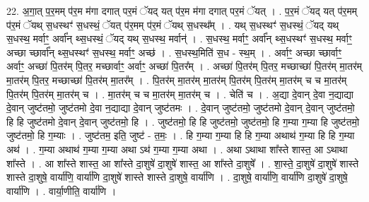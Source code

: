 \documentclass[17pt]{extarticle}
\begin{document}
22. अ॒गा॒त् प॒र॒मम् प॑र॒म म॑गा दगात् पर॒मं ॅयद् यत् प॑र॒म म॑गा दगात् पर॒मं ॅयत् । . प॒र॒मं ॅयद् यत् प॑र॒मम् प॑र॒मं ॅयथ् स॒धस्थꣳ॑ स॒धस्थं॒ ॅयत् प॑र॒मम् प॑र॒मं ॅयथ् स॒धस्थ᳚म् । . यथ् स॒धस्थꣳ॑ स॒धस्थं॒ ॅयद् यथ् स॒धस्थ॒ मर्वाꣳ॒॒ अर्वा᳚न् थ्स॒धस्थं॒ ॅयद् यथ् स॒धस्थ॒ मर्वान्॑ । . स॒धस्थ॒ मर्वाꣳ॒॒ अर्वा᳚न् थ्स॒धस्थꣳ॑ स॒धस्थ॒ मर्वाꣳ॒॒ अच्छा च्छार्वा᳚न् थ्स॒धस्थꣳ॑ स॒धस्थ॒ मर्वाꣳ॒॒ अच्छ॑ । . स॒धस्थ॒मिति॑ स॒ध - स्थ॒म् । . अर्वाꣳ॒॒ अच्छा च्छार्वाꣳ॒॒ अर्वाꣳ॒॒ अच्छा॑ पि॒तर॑म् पि॒तर॒ मच्छार्वाꣳ॒॒ अर्वाꣳ॒॒ अच्छा॑ पि॒तर᳚म् । . अच्छा॑ पि॒तर॑म् पि॒तर॒ मच्छाच्छा॑ पि॒तर॑म् मा॒तर॑म् मा॒तर॑म् पि॒तर॒ मच्छाच्छा॑ पि॒तर॑म् मा॒तर᳚म् । . पि॒तर॑म् मा॒तर॑म् मा॒तर॑म् पि॒तर॑म् पि॒तर॑म् मा॒तर॑म् च च मा॒तर॑म् पि॒तर॑म् पि॒तर॑म् मा॒तर॑म् च । . मा॒तर॑म् च च मा॒तर॑म् मा॒तर॑म् च । . चेति॑ च । . अ॒द्या दे॒वान् दे॒वा न॒द्याद्या दे॒वान् जुष्ट॑तमो॒ जुष्ट॑तमो दे॒वा न॒द्याद्या दे॒वान् जुष्ट॑तमः । . दे॒वान् जुष्ट॑तमो॒ जुष्ट॑तमो दे॒वान् दे॒वान् जुष्ट॑तमो॒ हि हि जुष्ट॑तमो दे॒वान् दे॒वान् जुष्ट॑तमो॒ हि । . जुष्ट॑तमो॒ हि हि जुष्ट॑तमो॒ जुष्ट॑तमो॒ हि ग॒म्या ग॒म्या हि जुष्ट॑तमो॒ जुष्ट॑तमो॒ हि ग॒म्याः । . जुष्ट॑तम॒ इति॒ जुष्ट॑ - त॒मः॒ । . हि ग॒म्या ग॒म्या हि हि ग॒म्या अथाथ॑ ग॒म्या हि हि ग॒म्या अथ॑ । . ग॒म्या अथाथ॑ ग॒म्या ग॒म्या अथा ऽथ॑ ग॒म्या ग॒म्या अथा । . अथा ऽथाथा शा᳚स्ते शास्त॒ आ ऽथाथा शा᳚स्ते । . आ शा᳚स्ते शास्त॒ आ शा᳚स्ते दा॒शुषे॑ दा॒शुषे॑ शास्त॒ आ शा᳚स्ते दा॒शुषे᳚ । . शा॒स्ते॒ दा॒शुषे॑ दा॒शुषे॑ शास्ते शास्ते दा॒शुषे॒ वार्या॑णि॒ वार्या॑णि दा॒शुषे॑ शास्ते शास्ते दा॒शुषे॒ वार्या॑णि । . दा॒शुषे॒ वार्या॑णि॒ वार्या॑णि दा॒शुषे॑ दा॒शुषे॒ वार्या॑णि । . वार्या॒णीति॒ वार्या॑णि । \newline
\pagebreak
{}
\end{document}
